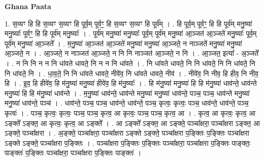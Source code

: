 \documentclass[17pt]{extarticle}
\begin{document}
\textbf{Ghana Paata } \newline

1. स॒व्यꣳ हि हि स॒व्यꣳ स॒व्यꣳ हि पूर्व॒म् पूर्वꣳ॒॒ हि स॒व्यꣳ स॒व्यꣳ हि पूर्व᳚म् । . हि पूर्व॒म् पूर्वꣳ॒॒ हि हि पूर्व॑म् मनु॒ष्या॑ मनु॒ष्याः᳚ पूर्वꣳ॒॒ हि हि पूर्व॑म् मनु॒ष्याः᳚ । . पूर्व॑म् मनु॒ष्या॑ मनु॒ष्याः᳚ पूर्व॒म् पूर्व॑म् मनु॒ष्या॑ आ॒ञ्जत॑ आ॒ञ्जते॑ मनु॒ष्याः᳚ पूर्व॒म् पूर्व॑म् मनु॒ष्या॑ आ॒ञ्जते᳚ । . म॒नु॒ष्या॑ आ॒ञ्जत॑ आ॒ञ्जते॑ मनु॒ष्या॑ मनु॒ष्या॑ आ॒ञ्जते॒ न नाञ्जते॑ मनु॒ष्या॑ मनु॒ष्या॑ आ॒ञ्जते॒ न । . आ॒ञ्जते॒ न नाञ्जत॑ आ॒ञ्जते॒ न नि नि नाञ्जत॑ आ॒ञ्जते॒ न नि । . आ॒ञ्जत॒ इत्या᳚ - अ॒ञ्जते᳚ । . न नि नि न न नि धा॑वते धावते॒ नि न न नि धा॑वते । . नि धा॑वते धावते॒ नि नि धा॑वते॒ नि नि धा॑वते॒ नि नि धा॑वते॒ नि । . धा॒व॒ते॒ नि नि धा॑वते धावते॒ नीवे॑व॒ नि धा॑वते धावते॒ नीव॑ । . नीवे॑व॒ नि नीव॒ हि हीव॒ नि नीव॒ हि । . इ॒व॒ हि हीवे॑व॒ हि म॑नु॒ष्या॑ मनु॒ष्या॑ हीवे॑व॒ हि म॑नु॒ष्याः᳚ । . हि म॑नु॒ष्या॑ मनु॒ष्या॑ हि हि म॑नु॒ष्या॑ धाव॑न्ते॒ धाव॑न्ते मनु॒ष्या॑ हि हि म॑नु॒ष्या॑ धाव॑न्ते । . म॒नु॒ष्या॑ धाव॑न्ते॒ धाव॑न्ते मनु॒ष्या॑ मनु॒ष्या॑ धाव॑न्ते॒ पञ्च॒ पञ्च॒ धाव॑न्ते मनु॒ष्या॑ मनु॒ष्या॑ धाव॑न्ते॒ पञ्च॑ । . धाव॑न्ते॒ पञ्च॒ पञ्च॒ धाव॑न्ते॒ धाव॑न्ते॒ पञ्च॒ कृत्वः॒ कृत्वः॒ पञ्च॒ धाव॑न्ते॒ धाव॑न्ते॒ पञ्च॒ कृत्वः॑ । . पञ्च॒ कृत्वः॒ कृत्वः॒ पञ्च॒ पञ्च॒ कृत्व॒ आ कृत्वः॒ पञ्च॒ पञ्च॒ कृत्व॒ आ । . कृत्व॒ आ कृत्वः॒ कृत्व॒ आ ऽङ्क्ते᳚ ऽङ्क्त॒ आ कृत्वः॒ कृत्व॒ आ ऽङ्क्ते᳚ । . आ ऽङ्क्ते᳚ ऽङ्क्त॒ आ ऽङ्क्ते॒ पञ्चा᳚क्षरा॒ पञ्चा᳚क्षरा ऽङ्क्त॒ आ ऽङ्क्ते॒ पञ्चा᳚क्षरा । . अ॒ङ्क्ते॒ पञ्चा᳚क्षरा॒ पञ्चा᳚क्षरा ऽङ्क्ते ऽङ्क्ते॒ पञ्चा᳚क्षरा प॒ङ्क्तिः प॒ङ्क्तिः पञ्चा᳚क्षरा ऽङ्क्ते ऽङ्क्ते॒ पञ्चा᳚क्षरा प॒ङ्क्तिः । . पञ्चा᳚क्षरा प॒ङ्क्तिः प॒ङ्क्तिः पञ्चा᳚क्षरा॒ पञ्चा᳚क्षरा प॒ङ्क्तिः पाङ्क्तः॒ पाङ्क्तः॑ प॒ङ्क्तिः पञ्चा᳚क्षरा॒ पञ्चा᳚क्षरा प॒ङ्क्तिः पाङ्क्तः॑ । \newline
\end{document}
